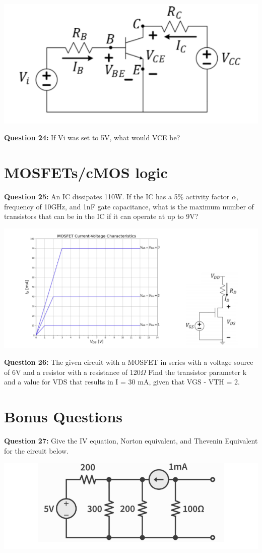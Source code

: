 \documentclass{article}
\begin{document}
\begin{center}

    \includegraphics[width=0.75\linewidth]{figures/56.png}
\end{center}


\textbf{Question 24:} If Vi was set to 5V, what would VCE be?


\section*{MOSFETs/cMOS logic}
\textbf{Question 25:} An IC dissipates 110W. If the IC has a 5\% activity factor \(\alpha\), frequency of 10GHz, and 1nF gate capacitance, what is the maximum number of transistors that can be in the IC if it can operate at up to 9V?

\begin{center}

        \includegraphics[width=1\linewidth]{figures/78.png}
\end{center}

\textbf{Question 26:} The given circuit with a MOSFET in series with a voltage source of 6V and a resistor with a resistance of 120\(\Omega\)
Find the transistor parameter k and a value for VDS that results in I = 30 mA, given that VGS - VTH = 2.

\section*{Bonus Questions}

\textbf{Question 27:} Give the IV equation, Norton equivalent, and Thevenin Equivalent for the circuit below.

\begin{center}

    \includegraphics[width=0.75\linewidth]{figures/99.png}
\end{center}
\end{document}
